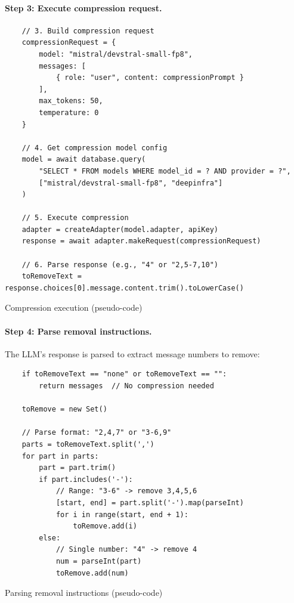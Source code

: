 \documentclass[english]{article}
\begin{document}
\paragraph{Step 3: Execute compression request.}

\begin{listing}[H]
\begin{verbatim}
    // 3. Build compression request
    compressionRequest = {
        model: "mistral/devstral-small-fp8",
        messages: [
            { role: "user", content: compressionPrompt }
        ],
        max_tokens: 50,
        temperature: 0
    }

    // 4. Get compression model config
    model = await database.query(
        "SELECT * FROM models WHERE model_id = ? AND provider = ?",
        ["mistral/devstral-small-fp8", "deepinfra"]
    )

    // 5. Execute compression
    adapter = createAdapter(model.adapter, apiKey)
    response = await adapter.makeRequest(compressionRequest)

    // 6. Parse response (e.g., "4" or "2,5-7,10")
    toRemoveText = response.choices[0].message.content.trim().toLowerCase()
\end{verbatim}
\caption{Compression execution (pseudo-code)}
\end{listing}

\paragraph{Step 4: Parse removal instructions.}

The LLM's response is parsed to extract message numbers to remove:

\begin{listing}[H]
\begin{verbatim}
    if toRemoveText == "none" or toRemoveText == "":
        return messages  // No compression needed

    toRemove = new Set()

    // Parse format: "2,4,7" or "3-6,9"
    parts = toRemoveText.split(',')
    for part in parts:
        part = part.trim()
        if part.includes('-'):
            // Range: "3-6" -> remove 3,4,5,6
            [start, end] = part.split('-').map(parseInt)
            for i in range(start, end + 1):
                toRemove.add(i)
        else:
            // Single number: "4" -> remove 4
            num = parseInt(part)
            toRemove.add(num)
\end{verbatim}
\caption{Parsing removal instructions (pseudo-code)}
\end{listing}
\end{document}
